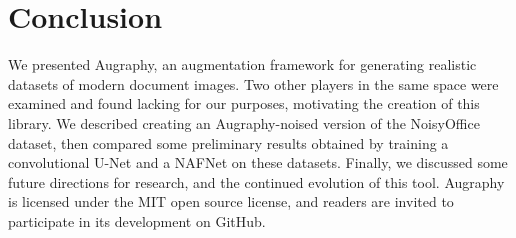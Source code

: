 \documentclass[runningheads]{llncs}
\begin{document}
\section{Conclusion}
We presented Augraphy, an augmentation framework for generating realistic datasets of modern document images.
Two other players in the same space were examined and found lacking for our purposes, motivating the creation of this library.
We described creating an Augraphy-noised version of the NoisyOffice dataset, then compared some preliminary results obtained by training a convolutional U-Net and a NAFNet on these datasets.
Finally, we discussed some future directions for research, and the continued evolution of this tool.
Augraphy is licensed under the MIT open source license, and readers are invited to participate in its development on GitHub.


%
%
%


\end{document}

